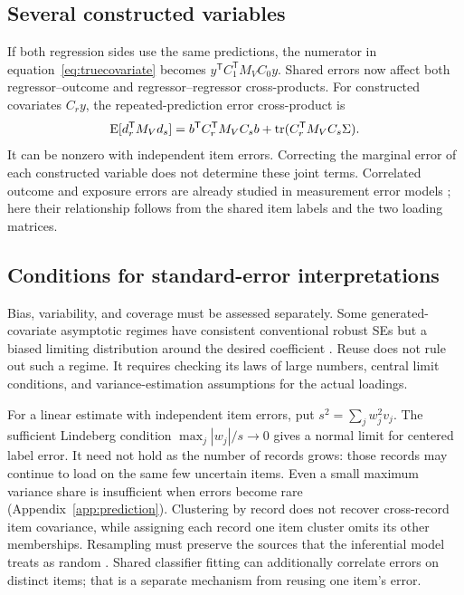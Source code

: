 \subsection{Several constructed variables}
If both regression sides use the same predictions, the numerator in
equation~\eqref{eq:truecovariate} becomes
$y^{\mathsf T}C_1^{\mathsf T}M_VC_0y$. Shared errors now affect both
regressor--outcome and regressor--regressor cross-products. For constructed
covariates $C_ry$, the repeated-prediction error cross-product is
\begin{equation}\label{eq:maincrossnormal}
\operatorname{E}[d_r^{\mathsf T}M_Vd_s]
=b^{\mathsf T}C_r^{\mathsf T}M_VC_sb
 +\operatorname{tr}(C_r^{\mathsf T}M_VC_s\Sigma).
\end{equation}
It can be nonzero with independent item errors. Correcting the marginal
error of each constructed variable does not determine these joint terms.
Correlated outcome and exposure errors are already studied in measurement
error models \citep{shaw2021correlated}; here their relationship follows
from the shared item labels and the two loading matrices.

\subsection{Conditions for standard-error interpretations}
Bias, variability, and coverage must be assessed separately. Some
generated-covariate asymptotic regimes have consistent conventional robust
SEs but a biased limiting distribution around the desired coefficient
\citep{christensen2026guide,battaglia2025generated}. Reuse does not rule out
such a regime. It requires checking its laws of large numbers, central limit
conditions, and variance-estimation assumptions for the actual loadings.

For a linear estimate with independent item errors, put
$s^2=\sum_jw_j^2v_j$. The sufficient Lindeberg condition
$\max_j|w_j|/s\to0$ gives a normal limit for centered label error. It need
not hold as the number of records grows: those records may continue to load
on the same few uncertain items. Even a small maximum variance share is
insufficient when errors become rare (Appendix~\ref{app:prediction}).
Clustering by record does not recover cross-record item covariance, while
assigning each record one item cluster omits its other memberships.
Resampling must preserve the sources that the inferential model treats as
random \citep{owen2012arrays}. Shared classifier fitting can additionally
correlate errors on distinct items; that is a separate mechanism from
reusing one item's error.
